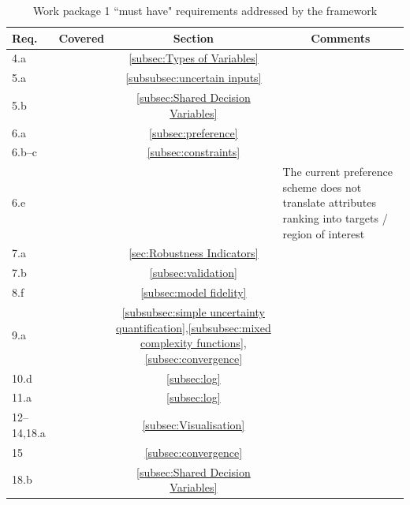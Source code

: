 \documentclass[a4paper]{article}
\newcommand{\cmark}{\ding{51}}%
\newcommand{\xmark}{\ding{55}}%
\begin{document}
\begin{table}
\caption{Work package 1 ``must have" requirements addressed by the framework}
\begin{tabularx}{\textwidth}{lccX} \toprule
{\bf Req.}	& {\bf Covered}	& {\bf Section}							& \multicolumn{1}{c}{\bf Comments}	\\ \midrule
4.a			&  \cmark 		& \ref{subsec:Types of Variables}		& 									\\
5.a			&  \cmark 		& \ref{subsubsec:uncertain inputs}		& 									\\
5.b			&  \cmark		& \ref{subsec:Shared Decision Variables}& 									\\
6.a			&  \cmark		& \ref{subsec:preference}				& 									\\
6.b--c		&  \cmark		& \ref{subsec:constraints}				& 									\\
6.e			&  \xmark		& 										& The current preference scheme does not translate attributes ranking into targets / region of interest\\
7.a			&  \cmark		& \ref{sec:Robustness Indicators}		& 									\\
7.b			&  \cmark		& \ref{subsec:validation}				& 						 			\\
8.f			&  \cmark		& \ref{subsec:model fidelity}			& 						 			\\
9.a			&  \cmark		& \ref{subsubsec:simple uncertainty quantification},\ref{subsubsec:mixed complexity functions},\ref{subsec:convergence}	& \\
10.d		&  \cmark		& \ref{subsec:log}						& 									\\
11.a		&  \cmark		& \ref{subsec:log}						& 									\\
12--14,18.a &  \cmark		& \ref{subsec:Visualisation}			& 									\\
15			&  \cmark		& \ref{subsec:convergence}				& 									\\
18.b		&  \cmark		& \ref{subsec:Shared Decision Variables}& 									\\
\bottomrule
\end{tabularx}
\label{tab:requirements}
\end{table}
\end{document}
